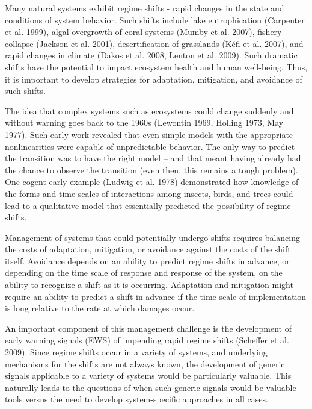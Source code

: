 \documentclass{article}
\begin{document}
Many natural systems exhibit regime shifts - rapid changes in the state
and conditions of system behavior. Such shifts include lake
eutrophication (Carpenter et al. 1999), algal overgrowth of coral
systems (Mumby et al. 2007), fishery collapse (Jackson et al. 2001),
desertification of grasslands (Kéfi et al. 2007), and rapid changes in
climate (Dakos et al. 2008, Lenton et al. 2009). Such dramatic shifts
have the potential to impact ecosystem health and human well-being.
Thus, it is important to develop strategies for adaptation, mitigation,
and avoidance of such shifts.

The idea that complex systems such as ecosystems could change suddenly
and without warning goes back to the 1960s (Lewontin 1969, Holling 1973,
May 1977). Such early work revealed that even simple models with the
appropriate nonlinearities were capable of unpredictable behavior. The
only way to predict the transition was to have the right model -- and
that meant having already had the chance to observe the transition (even
then, this remains a tough problem). One cogent early example (Ludwig et
al. 1978) demonstrated how knowledge of the forms and time scales of
interactions among insects, birds, and trees could lead to a qualitative
model that essentially predicted the possibility of regime shifts.

Management of systems that could potentially undergo shifts requires
balancing the costs of adaptation, mitigation, or avoidance against the
costs of the shift itself. Avoidance depends on an ability to predict
regime shifts in advance, or depending on the time scale of response and
response of the system, on the ability to recognize a shift as it is
occurring. Adaptation and mitigation might require an ability to predict
a shift in advance if the time scale of implementation is long relative
to the rate at which damages occur.

An important component of this management challenge is the development
of early warning signals (EWS) of impending rapid regime shifts
(Scheffer et al. 2009). Since regime shifts occur in a variety of
systems, and underlying mechanisms for the shifts are not always known,
the development of generic signals applicable to a variety of systems
would be particularly valuable. This naturally leads to the questions of
when such generic signals would be valuable tools versus the need to
develop system-specific approaches in all cases.
\end{document}
